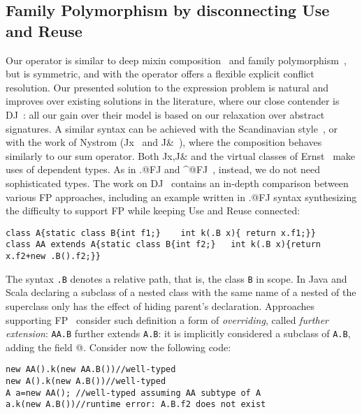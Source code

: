 \subsection{Family
Polymorphism by disconnecting Use and Reuse}
\saveSpace
Our \Q@Use@ operator is similar to deep mixin composition~\cite{Ernst99a,Zenger-Odersky2005, Hutchins06}
and family polymorphism~\cite{Ernst06, igarashi2005lightweight, IgarashiViroli07, IgarashiEtAl08}, but is symmetric, and with the operator
\Q@super@ offers a flexible  explicit conflict resolution.
Our presented solution to the expression problem is
natural and improves over existing solutions in the literature, where our close contender is DJ~\cite{deep}: all our gain over their model is based on our relaxation over abstract signatures.
A similar syntax can be achieved with the Scandinavian style~\cite{ernst2004expression}, or with the work of 
Nystrom (Jx~\cite{NystromEtAl04} and
J\&~\cite{nystrom2006j}), where the composition behaves similarly to our sum operator.
Both Jx,J\& and the virtual classes of Ernst~\cite{Ernst06}
make uses of dependent types.
As in \Q@.@FJ and \Q@^@FJ~\cite{igarashi2005lightweight,IgarashiEtAl08,IgarashiViroli07,saito2008essence},
 instead, we do not need sophisticated types. 
The work on DJ~\cite{deep} contains an in-depth comparison between various FP approaches, including an example written in \Q@.@FJ syntax synthesizing the difficulty to support FP while keeping Use and Reuse connected:
\saveSpace\saveSpace
\begin{lstlisting}
class A{static class B{int f1;}    int k(.B x){ return x.f1;}}
class AA extends A{static class B{int f2;}   int k(.B x){return x.f2+new .B().f2;}}
\end{lstlisting}\saveSpace\saveSpace
The syntax \lstinline{.B} denotes a relative path, that is, the 
class \lstinline{B} in scope.
In Java and Scala declaring a subclass of a nested class with the same
name of a nested of the superclass only has the effect of hiding parent's declaration.
Approaches supporting FP~\cite{igarashi2005lightweight,IgarashiEtAl08,nystrom2006j,Ernst06,BruceEtAl98,IgarashiViroli07,deep}
consider such definition a form of \emph{overriding},
called \emph{further extension}:
\lstinline{AA.B} further extends \lstinline{A.B}: it is implicitly considered a subclass of \lstinline{A.B}, adding the field @.
Consider now the following code:
\saveSpace\saveSpace\begin{lstlisting}
new AA().k(new AA.B())//well-typed
new A().k(new A.B())//well-typed
A a=new AA(); //well-typed assuming AA subtype of A
a.k(new A.B())//runtime error: A.B.f2 does not exist
\end{lstlisting}\saveSpace\saveSpace
